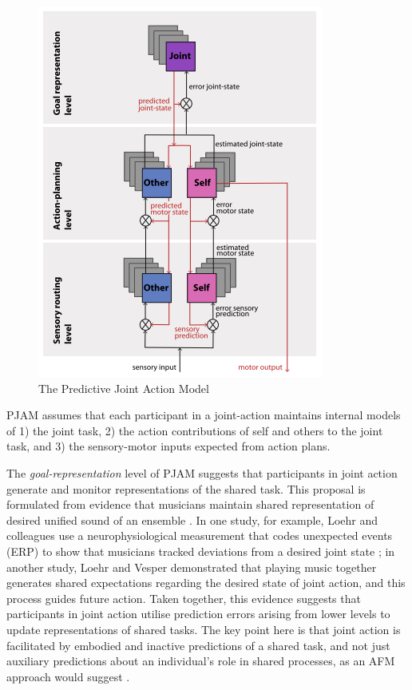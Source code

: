 \begin{CJK}{UTF8}{gbsn}
\begin{figure}[htbp]
  \begin{center}
    \includegraphics[scale=.8]{images/PJAM.png}
      \caption{The Predictive Joint Action Model \citep{Pesquita2017}}
        \label{fig:PJAM}
   \end{center}
\end{figure}

PJAM assumes that each participant in a joint-action maintains internal models of 1) the joint task, 2) the action contributions of self and others to the joint task, and  3) the sensory-motor inputs expected from action plans.

The \textit{goal-representation} level of PJAM suggests that participants in joint action generate and monitor representations of the shared task. This proposal is formulated from evidence that musicians maintain shared representation of desired unified sound of an ensemble \citep{Keller2008}.  In one study, for example, Loehr and colleagues  use a neurophysiological measurement that codes unexpected events (ERP) to show that musicians tracked deviations from a desired joint state \citep{Loehr2013}; in another study, Loehr and Vesper \textcite{Loehr2016} demonstrated that playing music together generates shared expectations regarding the desired state of joint action, and this process guides future action.  Taken together, this evidence suggests that participants in joint action utilise prediction errors arising from lower levels to update representations of shared tasks.  The key point here is that joint action is facilitated by embodied and inactive predictions of a shared task, and not just auxiliary predictions about an individual's role in shared processes, as an AFM approach would suggest \citep{Keller2016}.


\end{CJK}
